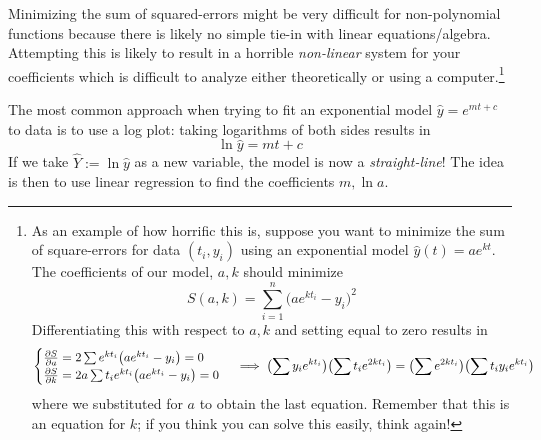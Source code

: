 Minimizing the sum of squared-errors might be very difficult for non-polynomial functions because there is likely no simple tie-in with linear equations/algebra. Attempting this is likely to result in a horrible \emph{non-linear} system for your coefficients which is difficult to analyze either theoretically or using a computer.\footnote{As an example of how horrific this is, suppose you want to minimize the sum of square-errors for data $(t_i,y_i)$ using an exponential model $\hat y(t)=ae^{kt}$. The coefficients of our model, $a,k$ should minimize
\[S(a,k)=\sum_{i=1}^n\bigl(ae^{kt_i}-y_i\bigr)^2\]
Differentiating this with respect to $a,k$ and setting equal to zero results in
\[
\begin{cases}
\partials[S]{a}=2\sum e^{kt_i}\bigl(ae^{kt_i}-y_i\bigr)=0 \\
\partials[S]{k}=2a\sum t_ie^{kt_i}\bigl(ae^{kt_i}-y_i\bigr)=0
\end{cases}
\implies  \bigl(\sum y_ie^{kt_i}\bigr)\bigl(\sum t_ie^{2kt_i}\bigr)=\bigl(\sum e^{2kt_i}\bigr)\bigl(\sum t_iy_ie^{kt_i}\bigr)
\]
where we substituted for $a$ to obtain the last equation. Remember that this is an equation for $k$; if you think you can solve this easily, think again!
}


The most common approach when trying to fit an exponential model $\hat y=e^{mt+c}$ to data is to use a log plot: taking logarithms of both sides results in
\[\ln\hat y=mt+c\]
If we take $\hat Y:=\ln\hat y$ as a new variable, the model is now a \emph{straight-line}! The idea is then to use linear regression to find the coefficients $m,\ln a$.

